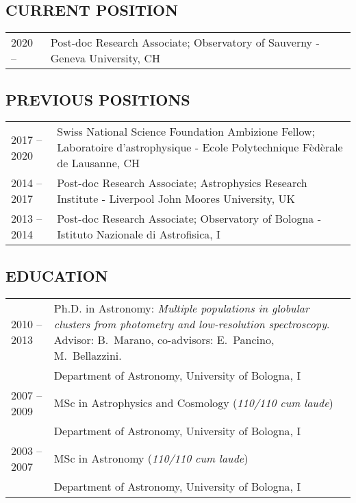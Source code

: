 \documentclass[ 11pt]{article}
\begin{document}
\subsection*{CURRENT POSITION}
\begin{tabular}{p{2cm}p{14cm}}
2020 -- & Post-doc Research Associate;  Observatory of Sauverny - Geneva University,  CH\\

\end{tabular}


  
\subsection*{PREVIOUS POSITIONS}
\begin{tabular}{p{2cm}p{14cm}}
  2017 -- 2020 &Swiss National Science Foundation Ambizione Fellow; Laboratoire d'astrophysique -
	    Ecole Polytechnique F\`ed\`erale de Lausanne, CH\\
2014 -- 2017 & Post-doc Research Associate; Astrophysics Research Institute - Liverpool John Moores University, UK\\
 2013 -- 2014 & Post-doc Research Associate;  Observatory of Bologna - Istituto Nazionale di Astrofisica, I\\
\end{tabular}


  \subsection*{EDUCATION}
\begin{tabular}{p{2cm}p{14cm}}

  2010 -- 2013 & Ph.D. in Astronomy: {\em Multiple populations in globular clusters from photometry and low-resolution spectroscopy}. Advisor: B.~Marano, co-advisors: E.~Pancino, M.~Bellazzini.\\
                     &Department of Astronomy, University of Bologna, I\\
  2007 -- 2009  & MSc in Astrophysics and Cosmology ({\em 110/110 cum laude})\\
                      &  Department of Astronomy, University of Bologna, I\\
2003 -- 2007  & MSc  in Astronomy  ({\em 110/110 cum laude}) \\
		    & Department of Astronomy, University of Bologna, I\\

\end{tabular}
\end{document}

